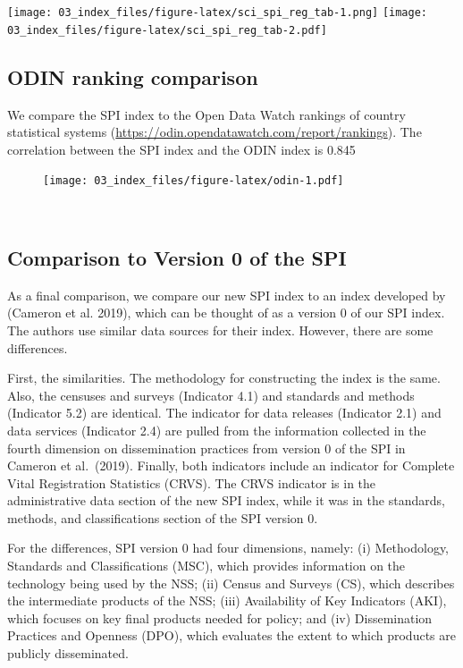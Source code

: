 \documentclass[
]{article}
\begin{document}
\texttt{[image: 03\_index\_files/figure-latex/sci\_spi\_reg\_tab-1.png]}
\texttt{[image: 03\_index\_files/figure-latex/sci\_spi\_reg\_tab-2.pdf]}

\hypertarget{odin-ranking-comparison}{%
\subsection{ODIN ranking comparison}\label{odin-ranking-comparison}}

We compare the SPI index to the Open Data Watch rankings of country statistical systems (\url{https://odin.opendatawatch.com/report/rankings}). The correlation between the SPI index and the ODIN index is 0.845

\begin{figure}
\centering
\texttt{[image: 03\_index\_files/figure-latex/odin-1.pdf]}
\caption{\label{fig:odin}~}
\end{figure}

\hypertarget{comparison-to-version-0-of-the-spi}{%
\subsection{Comparison to Version 0 of the SPI}\label{comparison-to-version-0-of-the-spi}}

As a final comparison, we compare our new SPI index to an index developed by (Cameron et al. 2019), which can be thought of as a version 0 of our SPI index. The authors use similar data sources for their index. However, there are some differences.

First, the similarities. The methodology for constructing the index is the same. Also, the censuses and surveys (Indicator 4.1) and standards and methods (Indicator 5.2) are identical. The indicator for data releases (Indicator 2.1) and data services (Indicator 2.4) are pulled from the information collected in the fourth dimension on dissemination practices from version 0 of the SPI in Cameron et al.~(2019). Finally, both indicators include an indicator for Complete Vital Registration Statistics (CRVS). The CRVS indicator is in the administrative data section of the new SPI index, while it was in the standards, methods, and classifications section of the SPI version 0.

For the differences, SPI version 0 had four dimensions, namely: (i) Methodology, Standards and Classifications (MSC), which provides information on the technology being used by the NSS; (ii) Census and Surveys (CS), which describes the intermediate products of the NSS; (iii) Availability of Key Indicators (AKI), which focuses on key final products needed for policy; and (iv) Dissemination Practices and Openness (DPO), which evaluates the extent to which products are publicly disseminated.
\end{document}

